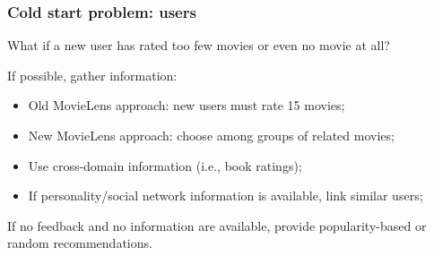 \documentclass[xcolor = {table}]{beamer}
\begin{document}
  \begin{frame}
    \frametitle{Cold start problem: users}

    What if a new user has rated too few movies or even no movie at all?

    \vspace{1em}

    If possible, gather information:

    \vspace{0.5em}

    \begin{itemize}
      \item Old MovieLens approach: new users must rate 15 movies;
      \item New MovieLens approach: choose among groups of related movies;
      \item Use cross-domain information (i.e., book ratings);
      \item If personality/social network information is available, link similar users;
    \end{itemize}

    \vspace{0.5em}

    If no feedback and no information are available, provide popularity-based or random recommendations.

  \end{frame}
\end{document}
